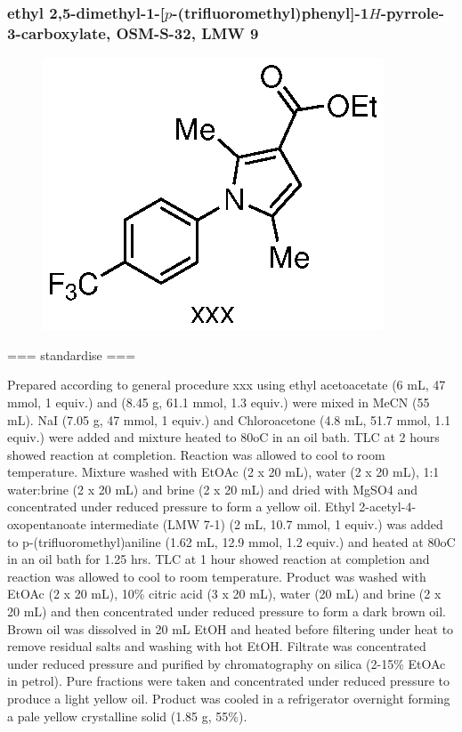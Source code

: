\documentclass[12pt, a4paper,titlepage]{article}
\begin{document}
{\subsubsection*{ethyl 2,5-dimethyl-1-[$p$-(trifluoromethyl)phenyl]-1$H$-pyrrole-3-carboxylate, OSM-S-32, LMW 9}
\label{exp:LMW9}
	\begin{figure}[H]
	\begin{center}
	\includegraphics{exp/LMW9.eps}
	\end{center}
	\vspace{-25pt}	
	\end{figure}
	
=== standardise ===

Prepared according to general procedure xxx using ethyl acetoacetate (6 mL, 47 mmol, 1 equiv.) and  (8.45 g, 61.1 mmol, 1.3 equiv.) were mixed in MeCN (55 mL). NaI (7.05 g, 47 mmol, 1 equiv.) and Chloroacetone (4.8 mL, 51.7 mmol, 1.1 equiv.) were added and mixture heated to 80oC in an oil bath. TLC at 2 hours showed reaction at completion. Reaction was allowed to cool to room temperature. Mixture washed with EtOAc (2 x 20 mL), water (2 x 20 mL), 1:1 water:brine (2 x 20 mL) and brine (2 x 20 mL) and dried with MgSO4 and concentrated under reduced pressure to form a yellow oil. Ethyl 2-acetyl-4-oxopentanoate intermediate (LMW 7-1) (2 mL, 10.7 mmol, 1 equiv.) was added to p-(trifluoromethyl)aniline (1.62 mL, 12.9 mmol, 1.2 equiv.) and heated at 80oC in an oil bath for 1.25 hrs. TLC at 1 hour showed reaction at completion and reaction was allowed to cool to room temperature. Product was washed with EtOAc (2 x 20 mL), 10\% citric acid (3 x 20 mL), water (20 mL) and brine (2 x 20 mL) and then concentrated under reduced pressure to form a dark brown oil. Brown oil was dissolved in 20 mL EtOH and heated before filtering under heat to remove residual salts and washing with hot EtOH. Filtrate was concentrated under reduced pressure and purified by chromatography on silica (2-15\% EtOAc in petrol). Pure fractions were taken and concentrated under reduced pressure to produce a light yellow oil. Product was cooled in a refrigerator overnight forming a pale yellow crystalline solid (1.85 g, 55\%).

}
\end{document}
